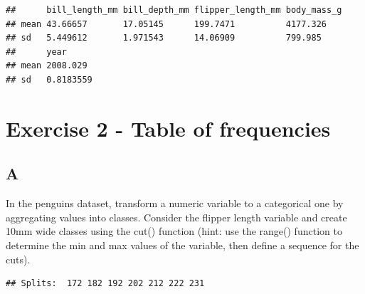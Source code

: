 \documentclass[
]{article}
\newenvironment{Shaded}{\begin{snugshade}}{\end{snugshade}}
\newcommand{\CharTok}[1]{\textcolor[rgb]{0.31,0.60,0.02}{#1}}
\newcommand{\DataTypeTok}[1]{\textcolor[rgb]{0.13,0.29,0.53}{#1}}
\newcommand{\DecValTok}[1]{\textcolor[rgb]{0.00,0.00,0.81}{#1}}
\newcommand{\KeywordTok}[1]{\textcolor[rgb]{0.13,0.29,0.53}{\textbf{#1}}}
\newcommand{\NormalTok}[1]{#1}
\newcommand{\OperatorTok}[1]{\textcolor[rgb]{0.81,0.36,0.00}{\textbf{#1}}}
\newcommand{\OtherTok}[1]{\textcolor[rgb]{0.56,0.35,0.01}{#1}}
\newcommand{\StringTok}[1]{\textcolor[rgb]{0.31,0.60,0.02}{#1}}
\begin{document}
\begin{verbatim}
##      bill_length_mm bill_depth_mm flipper_length_mm body_mass_g
## mean 43.66657       17.05145      199.7471          4177.326   
## sd   5.449612       1.971543      14.06909          799.985    
##      year     
## mean 2008.029 
## sd   0.8183559
\end{verbatim}

\hypertarget{exercise-2---table-of-frequencies}{%
\section{Exercise 2 - Table of
frequencies}\label{exercise-2---table-of-frequencies}}

\hypertarget{a-1}{%
\subsection{A}\label{a-1}}

In the penguins dataset, transform a numeric variable to a categorical
one by aggregating values into classes. Consider the flipper length
variable and create 10mm wide classes using the cut() function (hint:
use the range() function to determine the min and max values of the
variable, then define a sequence for the cuts).

\begin{Shaded}
\end{Shaded}

\begin{verbatim}
## Splits:  172 182 192 202 212 222 231
\end{verbatim}
\end{document}
